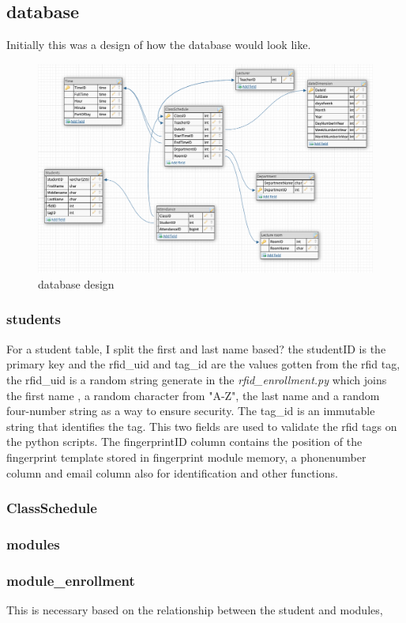 \subsection{database}
Initially this was a design of how the database would look like.
\begin{figure}[ht]
  \includegraphics[scale=0.4]{Design & Implementation/images/database_design.png}
  \caption{database design}
  \label{fig:database_design.png}
\end{figure}
\subsubsection{students}
For a student table, I split the first and last name based? the studentID is the primary key and the rfid\_uid and tag\_id are the values gotten from the rfid tag, the rfid\_uid is a random string generate in the \textit{rfid\_enrollment.py} which joins the first name , a random character from "A-Z", the last name and a random four-number string as a way to ensure security. The tag\_id is an immutable string that identifies the tag. This two fields are used to validate the rfid tags on the python scripts. The fingerprintID column contains the position of the fingerprint template stored in fingerprint module memory, a phonenumber column and email column also for identification and other functions.
\subsubsection{ClassSchedule}
\subsubsection{modules}
\subsubsection{module\_enrollment}
This is necessary based on the relationship between the student and modules, 
